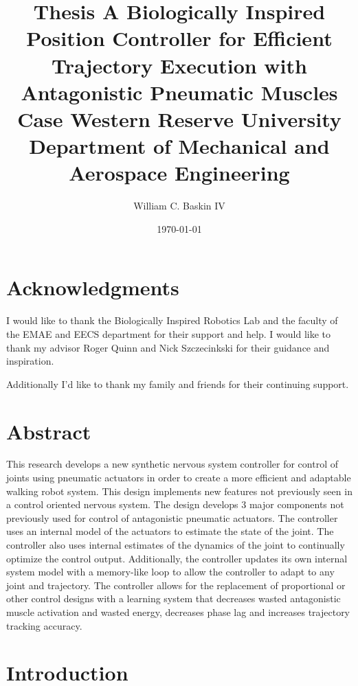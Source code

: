 \documentclass[12pt, letterpaper, oneside, onecolumn]{report} %
\author{William C. Baskin IV}
\title{Thesis}
\title{
  {A Biologically Inspired Position Controller for Efficient Trajectory Execution with Antagonistic Pneumatic Muscles}\\
  {\large Case Western Reserve University \\
  Department of Mechanical and Aerospace Engineering}%
}
\date{\today}
\begin{document}
\maketitle


\tableofcontents

\listoffigures

\chapter*{Acknowledgments}
\label{chap:acknowledgements}

I would like to thank the Biologically Inspired Robotics Lab and the faculty of
the EMAE and EECS department for their support and help. I would like to thank my advisor Roger Quinn and Nick Szczecinkski for their guidance and inspiration.

Additionally I'd like to thank my family and friends for their continuing support.

\chapter*{Abstract}
\label{chap:abstract}

This research develops a new synthetic nervous system controller for control of joints using pneumatic actuators in order to create a more efficient and adaptable walking robot system. This design implements new features not previously seen in a control oriented nervous system. The design develops 3 major components not previously used for control of antagonistic pneumatic actuators. The controller uses an internal model of the actuators to estimate the state of the joint. The controller also uses internal estimates of the dynamics of the joint to continually optimize the control output. Additionally, the controller updates its own internal system model with a memory-like loop to allow the controller to adapt to any joint and trajectory. The controller allows for the replacement of proportional or other control designs with a learning system that decreases wasted antagonistic muscle activation and wasted energy, decreases phase lag and increases trajectory tracking accuracy.


\chapter{Introduction}
\label{chap:introduction}
\end{document}
